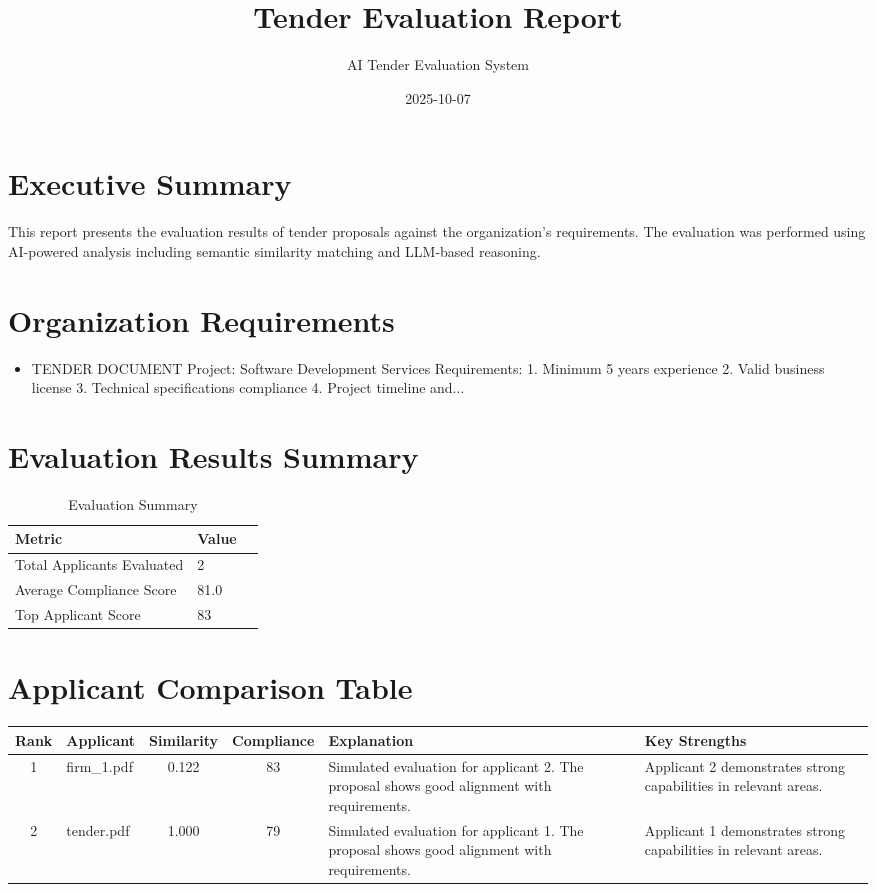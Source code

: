 \documentclass[12pt,a4paper]{article}
\title{\textbf{\textcolor{primary}{ Tender Evaluation Report }}}
\date{ 2025-10-07 }
\author{AI Tender Evaluation System}
\begin{document}
\maketitle

\section*{Executive Summary}
This report presents the evaluation results of tender proposals against the organization's requirements. The evaluation was performed using AI-powered analysis including semantic similarity matching and LLM-based reasoning.

\section*{Organization Requirements}

\begin{itemize}
    \item TENDER DOCUMENT
Project: Software Development Services
Requirements:
1. Minimum 5 years experience
2. Valid business license
3. Technical specifications compliance
4. Project timeline and...
\end{itemize}


\section*{Evaluation Results Summary}
\begin{table}[H]
\centering
\begin{tabularx}{\textwidth}{|l|X|l|}
\hline
\textbf{Metric} & \textbf{Value} \\
\hline
Total Applicants Evaluated & 2 \\
Average Compliance Score & 81.0 \\
Top Applicant Score & 83 \\
\hline
\end{tabularx}
\caption{Evaluation Summary}
\end{table}

\section*{Applicant Comparison Table}

\begin{longtable}{|c|p{3cm}|c|c|p{4cm}|p{3cm}|}
\hline
\textbf{Rank} & \textbf{Applicant} & \textbf{Similarity} & \textbf{Compliance} & \textbf{Explanation} & \textbf{Key Strengths} \\
\hline

1 & firm_1.pdf & 0.122 & 83 & Simulated evaluation for applicant 2. The proposal shows good alignment with requirements. & Applicant 2 demonstrates strong capabilities in relevant areas. \\
\hline

2 & tender.pdf & 1.000 & 79 & Simulated evaluation for applicant 1. The proposal shows good alignment with requirements. & Applicant 1 demonstrates strong capabilities in relevant areas. \\
\hline

\end{longtable}
\end{document}
